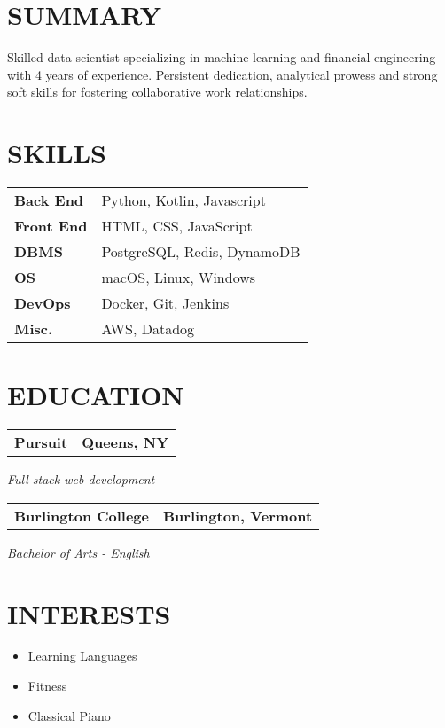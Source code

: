 \documentclass[11pt,a4paper]{moderncv}
\newcommand*{\educationentry}[4][0.5mm]{
    \begin{tabularx}{\textwidth}{LR}
        {\bfseries #3} & {\bfseries #4} \\
    \end{tabularx}
    {\itshape #2}
    \par\addvspace{#1}
}
\newcommand*{\scoreentry}[3][2.5mm]{
    {\bfseries #2} \\
    {\itshape #3}
    \par\addvspace{#1}
}
\begin{document}
\begin{minipage}[t]{0.35\textwidth}
\section{SUMMARY}
Skilled data scientist specializing in machine learning and financial engineering with 4 years of experience. Persistent dedication, analytical prowess and strong soft skills for fostering collaborative work relationships.

\section{SKILLS}
\begin{tabularx}{\textwidth}{>{\bfseries}l@{\hskip 3.5mm}L}
Back End & Python, Kotlin, Javascript \\
Front End & HTML, CSS, JavaScript \\
DBMS & PostgreSQL, Redis, DynamoDB \\
OS & macOS, Linux, Windows \\
DevOps & Docker, Git, Jenkins \\
Misc. & AWS, Datadog \\
\end{tabularx}

\section{EDUCATION}
\educationentry{Full-stack web development}{Pursuit}{Queens, NY}
\par
\vspace{3.0mm}
\educationentry{Bachelor of Arts - English}{Burlington College}{Burlington, Vermont}




\section{INTERESTS}
\begin{itemize}
    \item Learning Languages
    \item Fitness
    \item Classical Piano
\end{itemize}
\end{minipage}
\end{document}

